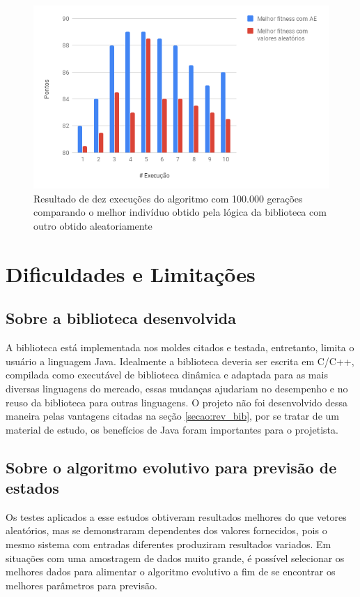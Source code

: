\begin{figure}[htb]
    \caption{Resultado de dez execuções do algoritmo com 100.000 gerações comparando o melhor indivíduo obtido pela lógica da biblioteca com outro obtido aleatoriamente}
    \label{figura:dez_execucoes}
    \centering
    \includegraphics[scale=0.8]{images/dez_execucoes}
    \fautor
\end{figure}

\section{Dificuldades e Limitações}

\subsection{Sobre a biblioteca desenvolvida}

A biblioteca está implementada nos moldes citados e testada, entretanto, limita o usuário a linguagem Java. Idealmente a biblioteca deveria ser escrita em C/C++, compilada como executável de biblioteca dinâmica e adaptada para as mais diversas linguagens do mercado, essas mudanças ajudariam no desempenho e no reuso da biblioteca para outras linguagens. O projeto não foi desenvolvido dessa maneira pelas vantagens citadas na seção \ref{secao:rev_bib}, por se tratar de um material de estudo, os benefícios de Java foram importantes para o projetista.

\subsection{Sobre o algoritmo evolutivo para previsão de estados}

Os testes aplicados a esse estudos obtiveram resultados melhores do que vetores aleatórios, mas se demonstraram dependentes dos valores fornecidos, pois o mesmo sistema com entradas diferentes produziram resultados variados. Em situações com uma amostragem de dados muito grande, é possível selecionar os melhores dados para alimentar o algoritmo evolutivo a fim de se encontrar os melhores parâmetros para previsão.

